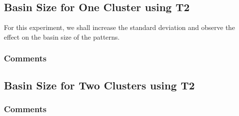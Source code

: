 \subsection{Basin Size for One Cluster using T2}

For this experiment, we shall increase the standard deviation and observe the effect on the basin size of the patterns.


\subsubsection{Comments}

\subsection{Basin Size for Two Clusters using T2}

\subsubsection{Comments}
\\





